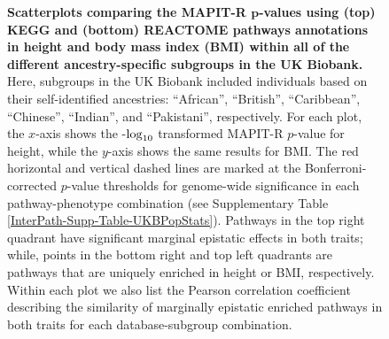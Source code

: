 \documentclass[10pt]{article}
\def\log{{\rm log}}
\begin{document}
\begin{landscape}
\begin{figure}[htbp]
\caption{\textbf{Scatterplots comparing the MAPIT-R $\bm{p}$-values using (top) KEGG and (bottom) REACTOME pathways annotations in height and body mass index (BMI) within all of the different ancestry-specific subgroups in the UK Biobank.} Here, subgroups in the UK Biobank included individuals based on their self-identified ancestries: ``African'', ``British'', ``Caribbean'', ``Chinese'', ``Indian'', and ``Pakistani'', respectively. For each plot, the $x$-axis shows the -$\log_{10}$ transformed MAPIT-R $p$-value for height, while the $y$-axis shows the same results for BMI. The red horizontal and vertical dashed lines are marked at the Bonferroni-corrected $p$-value thresholds for genome-wide significance in each pathway-phenotype combination (see Supplementary Table \ref{InterPath-Supp-Table-UKBPopStats}). Pathways in the top right quadrant have significant marginal epistatic effects in both traits; while, points in the bottom right and top left quadrants are pathways that are uniquely enriched in height or BMI, respectively. Within each plot we also list the Pearson correlation coefficient describing the similarity of marginally epistatic enriched pathways in both traits for each database-subgroup combination.}
\label{InterPath-Supp-Figure-MAPITR-PhenoComps-AllPops}
\end{figure}
\clearpage
\setlength{\footskip}{1cm}
\end{landscape}
\end{document}
